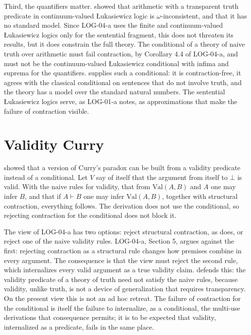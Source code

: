 \documentclass{situationist-preprint}
\begin{document}
Third, the quantifiers matter. \citet{Restall1992} showed that arithmetic with a transparent truth predicate in continuum-valued Łukasiewicz logic is $\omega$-inconsistent, and \citet{HajekEtAl2000} that it has no standard model. Since LOG-04-a uses the finite and continuum-valued Łukasiewicz logics only for the sentential fragment, this does not threaten its results, but it does constrain the full theory. The conditional of a theory of naive truth over arithmetic must fail contraction, by Corollary 4.4 of LOG-04-a, and must not be the continuum-valued Łukasiewicz conditional with infima and suprema for the quantifiers. \citet{Field2008} supplies such a conditional: it is contraction-free, it agrees with the classical conditional on sentences that do not involve truth, and the theory has a model over the standard natural numbers. The sentential Łukasiewicz logics serve, as LOG-01-a notes, as approximations that make the failure of contraction visible.

\section{Validity Curry}

\citet{BeallMurzi2013} showed that a version of Curry's paradox can be built from a validity predicate instead of a conditional. Let $V$ say of itself that the argument from itself to $\bot$ is valid. With the naive rules for validity, that from $\mathrm{Val}(A, B)$ and $A$ one may infer $B$, and that if $A \vdash B$ one may infer $\mathrm{Val}(A, B)$, together with structural contraction, everything follows. The derivation does not use the conditional, so rejecting contraction for the conditional does not block it.

The view of LOG-04-a has two options: reject structural contraction, as \citet{Zardini2011} does, or reject one of the naive validity rules. LOG-04-a, Section 5, argues against the first: rejecting contraction as a structural rule changes how premises combine in every argument. The consequence is that the view must reject the second rule, which internalizes every valid argument as a true validity claim. \citet{Field2017} defends this: the validity predicate of a theory of truth need not satisfy the naive rules, because validity, unlike truth, is not a device of generalization that requires transparency. On the present view this is not an ad hoc retreat. The failure of contraction for the conditional is itself the failure to internalize, as a conditional, the multi-use derivations that consequence permits; it is to be expected that validity, internalized as a predicate, fails in the same place.
\end{document}
